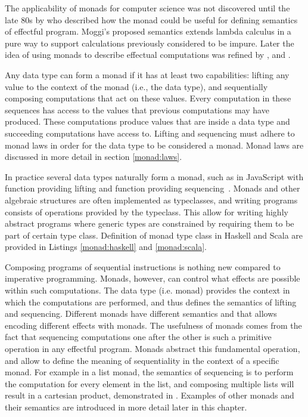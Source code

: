 



The applicability of monads for computer science was not discovered until the late 80s by \textcite{comp-lambda-monads} who described how the monad could be useful for defining semantics of effectful program. Moggi's proposed semantics extends lambda calculus in a pure way to support calculations previously considered to be impure. Later the idea of using monads to describe effectual computations was refined by \textcite{comprehending-monads}, \textcite{notions-computations} and \textcite{monads-for-fp}.

Any data type can form a monad if it has at least two capabilities: lifting any value to the context of the monad (i.e., the data type), and sequentially composing computations that act on these values. Every computation in these sequences has access to the values that previous computations may have produced. These computations produce values that are inside a data type and succeeding computations have access to. Lifting and sequencing must adhere to monad laws in order for the data type to be considered a monad. Monad laws are discussed in more detail in section \ref{monad:laws}.

In practice several data types naturally form a monad, such as  in JavaScript with  function providing lifting and  function providing sequencing~\cite{js-array}. Monads and other algebraic structures are often implemented as typeclasses, and writing programs consists of operations provided by the typeclass. This allow for writing highly abstract programs where generic types are constrained by requiring them to be part of certain type class. Definition of monad type class in Haskell and Scala are provided in Listings \ref{monad:haskell} and \ref{monad:scala}.





Composing programs of sequential instructions is nothing new compared to imperative programming. Monads, however, can control what effects are possible within such computations. The data type (i.e. monad) provides the context in which the computations are performed, and thus defines the semantics of lifting and sequencing. Different monads have different semantics and that allows encoding different effects with monads. The usefulness of monads comes from the fact that sequencing computations one after the other is such a primitive operation in any effectful program. Monads abstract this fundamental operation, and allow to define the meaning of sequentiality in the context of a specific monad. For example in a list monad, the semantics of sequencing is to perform the computation for every element in the list, and composing multiple lists will result in a cartesian product, demonstrated in . Examples of other monads and their semantics are introduced in more detail later in this chapter.

